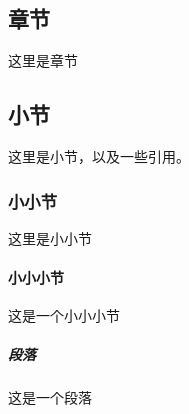 
\begin{refsection}

\chapter{章节}

这里是章节

\section{小节}
这里是小节，以及一些引用。\cite{test-zh,pei2017deepxplore,ma2018deepgauge}

\subsection{小小节}

这里是小小节

\subsubsection{小小小节} 这是一个小小小节

\paragraph*{段落} 这是一个段落

\clearpage
\printbibliography[heading=subbibnumbered]


\end{refsection}

